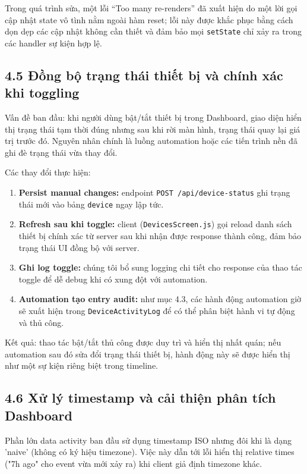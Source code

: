 \documentclass[12pt]{article}
\begin{document}
Trong quá trình sửa, một lỗi ``Too many re-renders'' đã xuất hiện do một lời gọi cập nhật state vô tình nằm ngoài hàm reset; lỗi này được khắc phục bằng cách dọn dẹp các cập nhật không cần thiết và đảm bảo mọi \texttt{setState} chỉ xảy ra trong các handler sự kiện hợp lệ.

\subsection{4.5 Đồng bộ trạng thái thiết bị và chính xác khi toggling}
Vấn đề ban đầu: khi người dùng bật/tắt thiết bị trong Dashboard, giao diện hiển thị trạng thái tạm thời đúng nhưng sau khi rời màn hình, trạng thái quay lại giá trị trước đó. Nguyên nhân chính là luồng automation hoặc các tiến trình nền đã ghi đè trạng thái vừa thay đổi.

Các thay đổi thực hiện:
\begin{enumerate}[noitemsep]
  \item \textbf{Persist manual changes:} endpoint \texttt{POST /api/device-status} ghi trạng thái mới vào bảng \texttt{device} ngay lập tức.
  \item \textbf{Refresh sau khi toggle:} client (\texttt{DevicesScreen.js}) gọi reload danh sách thiết bị chính xác từ server sau khi nhận được response thành công, đảm bảo trạng thái UI đồng bộ với server.
  \item \textbf{Ghi log toggle:} chúng tôi bổ sung logging chi tiết cho response của thao tác toggle để dễ debug khi có xung đột với automation.
  \item \textbf{Automation tạo entry audit:} như mục 4.3, các hành động automation giờ sẽ xuất hiện trong \texttt{DeviceActivityLog} để có thể phân biệt hành vi tự động và thủ công.
\end{enumerate}

Kết quả: thao tác bật/tắt thủ công được duy trì và hiển thị nhất quán; nếu automation sau đó sửa đổi trạng thái thiết bị, hành động này sẽ được hiển thị như một sự kiện riêng biệt trong timeline.

\subsection{4.6 Xử lý timestamp và cải thiện phân tích Dashboard}
Phần lớn data activity ban đầu sử dụng timestamp ISO nhưng đôi khi là dạng 'naive' (không có ký hiệu timezone). Việc này dẫn tới lỗi hiển thị relative times ("7h ago" cho event vừa mới xảy ra) khi client giả định timezone khác.
\end{document}
